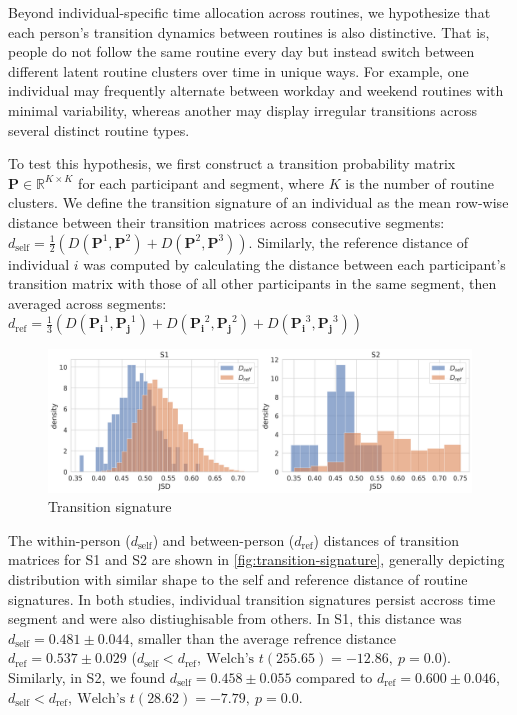 \documentclass[pdflatex,sn-vancouver,Numbered]{bst/sn-jnl}%
\theoremstyle{thmstyleone}%
\theoremstyle{thmstyletwo}%
\theoremstyle{thmstylethree}%
\newcommand{\dself}[2]{$d_{\text{self}} = #1 \pm #2$}
\newcommand{\dref}[2]{$d_{\text{ref}} = #1 \pm #2$}
\newcommand{\dselfdrefp}[3]{$d_{\text{self}} < d_{\text{ref}},\ \text{Welch's } t(#1) = #2,\ p = #3$}
\begin{document}
Beyond individual-specific time allocation across routines, we hypothesize that each person’s transition dynamics between routines is also distinctive. That is, people do not follow the same routine every day but instead switch between different latent routine clusters over time in unique ways. For example, one individual may frequently alternate between workday and weekend routines with minimal variability, whereas another may display irregular transitions across several distinct routine types.

To test this hypothesis, we first construct a transition probability matrix 
\(\mathbf{P} \in \mathbb{R}^{K \times K}\) for each participant and segment, 
where \(K\) is the number of routine clusters. We define the transition signature of an individual as the mean row-wise 
distance between their transition matrices across consecutive segments: 
\(d_{\mathrm{self}} = \frac{1}{2} (
D(\mathbf{P}^1, \mathbf{P}^{2}) + D(\mathbf{P}^2, \mathbf{P}^{3}))\). Similarly, the reference distance of individual $i$ was computed by calculating the distance between each participant’s transition matrix with those of all other participants in the same segment, then averaged across 
segments: 
\(d_{\mathrm{ref}} = \frac{1}{3} (
D(\mathbf{P_i}^1, \mathbf{P_j}^{1}) + D(\mathbf{P_i}^2, \mathbf{P_j}^{2}) +
D(\mathbf{P_i}^3, \mathbf{P_j}^{3}))\)

\begin{figure}
    \centering
    \includegraphics[width=1\linewidth]{figures/combined_transition_dself_dref_jsd.png}
    \caption{Transition signature}
    \label{fig:transition-signature}
\end{figure}

The within-person (\(d_{\text{self}}\)) and between-person (\(d_{\text{ref}}\)) distances of transition matrices for S1 and S2 are shown in \autoref{fig:transition-signature}, generally depicting distribution with similar shape to the self and reference distance of routine signatures. In both studies, individual transition signatures persist accross time segment and were also distiughisable from others. In S1, this distance was \dself{0.481}{0.044}, smaller than the average refrence distance \dref{0.537}{0.029} (\dselfdrefp{255.65}{-12.86}{0.0}). Similarly, in S2, we found \dself{0.458}{0.055} compared to \dref{0.600}{0.046}, \dselfdrefp{28.62}{-7.79}{0.0}.
\end{document}
